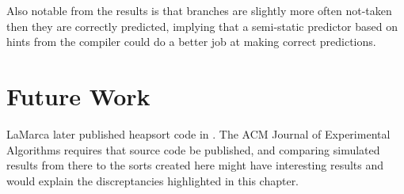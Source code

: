 Also notable from the results is that branches are slightly more often not-taken
then they are correctly predicted, implying that a semi-static predictor based
on hints from the compiler could do a better job at making correct predictions.

\section{Future Work}

LaMarca later published heapsort code in \cite{LaMarcaHeap96}. The ACM
Journal of Experimental Algorithms requires that source code be published, and
comparing simulated results from there to the sorts created here might have
interesting results and would explain the discreptancies highlighted in this
chapter.
